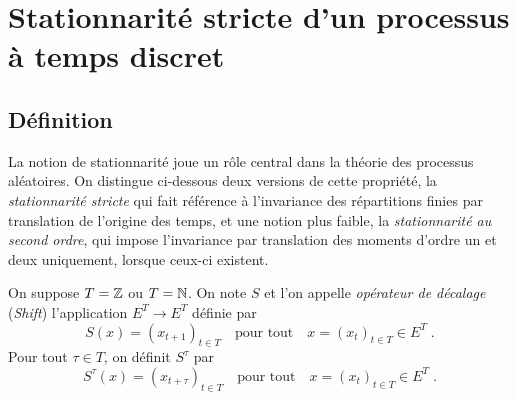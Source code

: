 



\section{Stationnarit\'e stricte d'un processus \`a temps discret}
\subsection{D\'efinition}
La notion de stationnarit\'e joue un r\^ole central dans la th\'eorie
des processus al\'eatoires. On distingue ci-dessous deux versions de cette
propri\'et\'e, la \emph{stationnarit\'e stricte} qui fait r\'ef\'erence \`a l'invariance des r\'epartitions finies par translation de l'origine des temps,
et une notion plus faible, la \emph{stationnarit\'e
au second ordre}, qui impose l'invariance par translation des moments
d'ordre un et deux uniquement, lorsque ceux-ci existent.




\begin{definition}
\label{def:retard}
On suppose $T=\mathbb{Z}$ ou $T=\mathbb{N}$.
On note $S$ et l'on appelle \emph{op\'erateur de d\'ecalage} (\emph{Shift}) l'application $E^T\to E^T$ d\'efinie par
$$
S(x)= (x_{t+1})_{t\in T}\quad \text{pour tout}\quad x=(x_t)_{t \in T} \in E^T\;.
$$
Pour tout $\tau\in T$, on d\'efinit $S^\tau$ par
$$
S^\tau(x)= (x_{t+\tau})_{t\in T}\quad \text{pour tout}\quad x=(x_t)_{t \in T} \in E^T\;.
$$
\end{definition}

